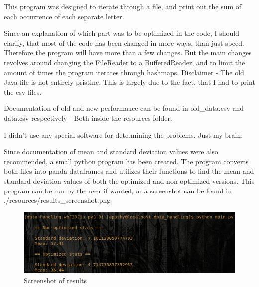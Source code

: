 \documentclass[a4paper, 12pt]{report}
\begin{document}
This program was designed to iterate through a file, and print out the sum of each occurrence of each separate letter. 

Since an explanation of which part was to be optimized in the code, I should clarify, that most of the code has been changed in more ways, than just speed. Therefore the program will have more than a few changes. But the main changes revolves around changing the FileReader to a BufferedReader, and to limit the amount of times the program iterates through hashmaps. Disclaimer - The old Java file is not entirely pristine. This is largely due to the fact, that I had to print the csv files. 

Documentation of old and new performance can be found in old\_data.csv and data.csv respectively - Both inside the resources folder.

I didn't use any special software for determining the problems. Just my brain.

Since documentation of mean and standard deviation values were also recommended, a small python program has been created. The program converts both files into panda dataframes and utilizes their functions to find the mean and standard deviation values of both the optimized and non-optimized versions. This program can be run by the user if wanted, or a screenshot can be found in ./resources/results\_screenshot.png

\begin{figure}[ht]
\centering
\includegraphics[width=12cm]{../resources/results_screenshot.png}
\caption{Screenshot of results}
\label{trash}
\label{praise kek}
\end{figure}
\end{document}
